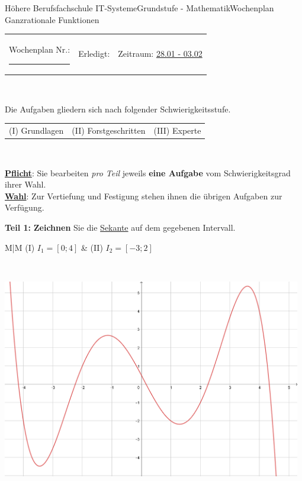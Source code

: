 \documentclass[oneside,openany,headings=optiontotoc,11pt,numbers=noenddot]{scrreprt}
\begin{document}
	\begin{worksheet}{Höhere Berufsfachschule IT-Systeme}{Grundstufe - Mathematik}{Wochenplan Ganzrationale Funktionen}
		\noindent
		\begin{tabularx}{\textwidth}{XXl}
			Wochenplan Nr.: \rule{0.15\textwidth}{1pt} & Erledigt: & Zeitraum: \underline{28.01 - 03.02}
		\end{tabularx}\\
		\par\noindent
		Die Aufgaben gliedern sich nach folgender Schwierigkeitsstufe.\\
		\begin{tabularx}{\textwidth}{XXX}
			(I) Grundlagen & (II) Forstgeschritten & (III) Experte
		\end{tabularx}\\
		\par\noindent
		\textbf{\underline{Pflicht}}: Sie bearbeiten \textit{pro Teil} jeweils \textbf{eine Aufgabe} vom Schwierigkeitsgrad ihrer Wahl.\\
		\underline{\textbf{Wahl}}: Zur Vertiefung und Festigung stehen ihnen die übrigen Aufgaben zur Verfügung.
		\begin{framed}
			\noindent
			\textbf{Teil 1:} \textbf{Zeichnen} Sie die \underline{Sekante} auf dem gegebenen Intervall.\\
			\par\noindent
			\renewcommand{\arraystretch}{1.5}
			\begin{tabularx}{\textwidth}{M|M}
				(I) \(I_1 = [0;4]\) & (II) \(I_2 = [-3;2]\)\\
				\hline
			\end{tabularx}\\
			\renewcommand{\arraystretch}{1}
			\par\bigskip\noindent
			\includegraphics[width=0.98\textwidth]{../99_Bilder/WP/WP12_T1.png}

\end{framed}
\end{worksheet}
\end{document}
